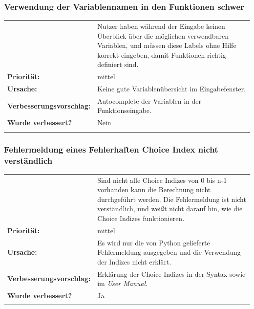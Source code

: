 \documentclass{article}
\begin{document}
\subsubsection*{Verwendung der Variablennamen in den Funktionen schwer}
\begin{tabular}{ll}
\begin{tabularx}{\textwidth}{rX}
    \textbf{Beschreibung:} & Nutzer haben während der Eingabe keinen Überblick über die möglichen verwendbaren Variablen, und müssen diese Labels ohne Hilfe korrekt eingeben, damit Funktionen richtig definiert sind.\\
    \textbf{Priorität:} & mittel\\
    \textbf{Ursache:} & Keine gute Variablenübersicht im Eingabefenster. \\
    \textbf{Verbesserungsvorschlag:} & Autocomplete der Variablen in der Funktionseingabe.\\
    \textbf{Wurde verbessert?} & Nein\\
    \end{tabularx}
\end{tabular}

\subsubsection*{Fehlermeldung eines Fehlerhaften Choice Index nicht verständlich}
\begin{tabular}{ll}
\begin{tabularx}{\textwidth}{rX}
    \textbf{Beschreibung:} & Sind nicht alle Choice Indizes von 0 bis n-1 vorhanden kann die Berechnung nicht durchgeführt werden. Die Fehlermeldung ist nicht verständlich, und weißt nicht darauf hin, wie die Choice Indizes funktionieren.\\
    \textbf{Priorität:} & mittel\\
    \textbf{Ursache:} & Es wird nur die von Python gelieferte Fehlermeldung ausgegeben und die Verwendung der Indizes nicht erklärt. \\
    \textbf{Verbesserungsvorschlag:} & Erklärung der Choice Indizes in der Syntax sowie im \emph{User Manual}.\\
    \textbf{Wurde verbessert?} & Ja\\
    \end{tabularx}
\end{tabular}
\end{document}
